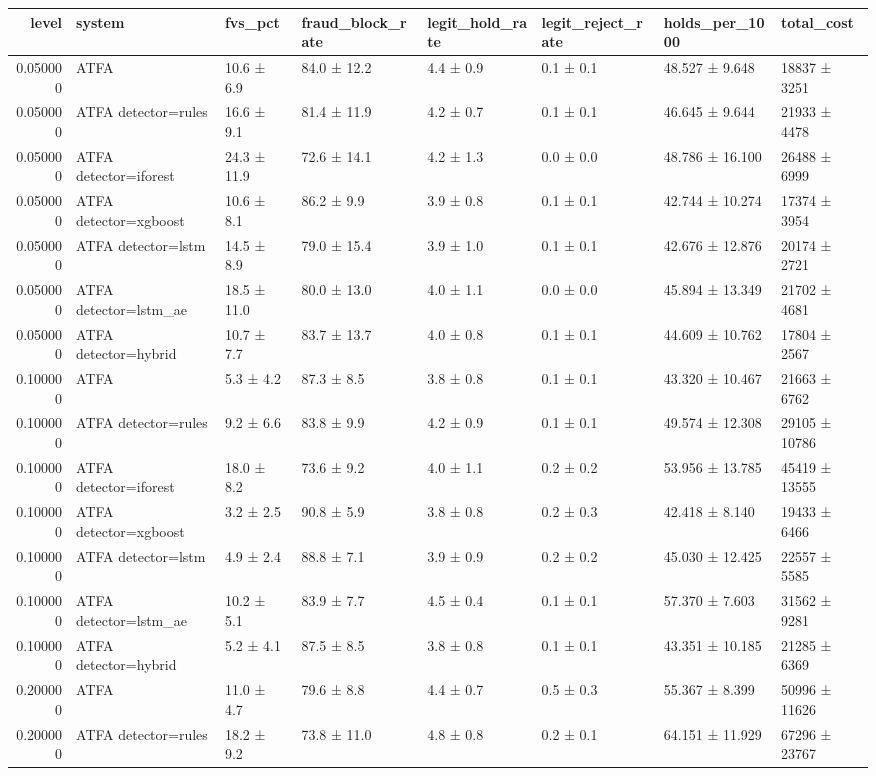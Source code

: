 \begin{tabular}{rlllllll}
\toprule
level & system & fvs\_pct & fraud\_block\_rate & legit\_hold\_rate & legit\_reject\_rate & holds\_per\_1000 & total\_cost \\
\midrule
0.050000 & ATFA & 10.6 ± 6.9 & 84.0 ± 12.2 & 4.4 ± 0.9 & 0.1 ± 0.1 & 48.527 ± 9.648 & 18837 ± 3251 \\
0.050000 & ATFA detector=rules & 16.6 ± 9.1 & 81.4 ± 11.9 & 4.2 ± 0.7 & 0.1 ± 0.1 & 46.645 ± 9.644 & 21933 ± 4478 \\
0.050000 & ATFA detector=iforest & 24.3 ± 11.9 & 72.6 ± 14.1 & 4.2 ± 1.3 & 0.0 ± 0.0 & 48.786 ± 16.100 & 26488 ± 6999 \\
0.050000 & ATFA detector=xgboost & 10.6 ± 8.1 & 86.2 ± 9.9 & 3.9 ± 0.8 & 0.1 ± 0.1 & 42.744 ± 10.274 & 17374 ± 3954 \\
0.050000 & ATFA detector=lstm & 14.5 ± 8.9 & 79.0 ± 15.4 & 3.9 ± 1.0 & 0.1 ± 0.1 & 42.676 ± 12.876 & 20174 ± 2721 \\
0.050000 & ATFA detector=lstm\_ae & 18.5 ± 11.0 & 80.0 ± 13.0 & 4.0 ± 1.1 & 0.0 ± 0.0 & 45.894 ± 13.349 & 21702 ± 4681 \\
0.050000 & ATFA detector=hybrid & 10.7 ± 7.7 & 83.7 ± 13.7 & 4.0 ± 0.8 & 0.1 ± 0.1 & 44.609 ± 10.762 & 17804 ± 2567 \\
0.100000 & ATFA & 5.3 ± 4.2 & 87.3 ± 8.5 & 3.8 ± 0.8 & 0.1 ± 0.1 & 43.320 ± 10.467 & 21663 ± 6762 \\
0.100000 & ATFA detector=rules & 9.2 ± 6.6 & 83.8 ± 9.9 & 4.2 ± 0.9 & 0.1 ± 0.1 & 49.574 ± 12.308 & 29105 ± 10786 \\
0.100000 & ATFA detector=iforest & 18.0 ± 8.2 & 73.6 ± 9.2 & 4.0 ± 1.1 & 0.2 ± 0.2 & 53.956 ± 13.785 & 45419 ± 13555 \\
0.100000 & ATFA detector=xgboost & 3.2 ± 2.5 & 90.8 ± 5.9 & 3.8 ± 0.8 & 0.2 ± 0.3 & 42.418 ± 8.140 & 19433 ± 6466 \\
0.100000 & ATFA detector=lstm & 4.9 ± 2.4 & 88.8 ± 7.1 & 3.9 ± 0.9 & 0.2 ± 0.2 & 45.030 ± 12.425 & 22557 ± 5585 \\
0.100000 & ATFA detector=lstm\_ae & 10.2 ± 5.1 & 83.9 ± 7.7 & 4.5 ± 0.4 & 0.1 ± 0.1 & 57.370 ± 7.603 & 31562 ± 9281 \\
0.100000 & ATFA detector=hybrid & 5.2 ± 4.1 & 87.5 ± 8.5 & 3.8 ± 0.8 & 0.1 ± 0.1 & 43.351 ± 10.185 & 21285 ± 6369 \\
0.200000 & ATFA & 11.0 ± 4.7 & 79.6 ± 8.8 & 4.4 ± 0.7 & 0.5 ± 0.3 & 55.367 ± 8.399 & 50996 ± 11626 \\
0.200000 & ATFA detector=rules & 18.2 ± 9.2 & 73.8 ± 11.0 & 4.8 ± 0.8 & 0.2 ± 0.1 & 64.151 ± 11.929 & 67296 ± 23767 \\

\end{tabular}

